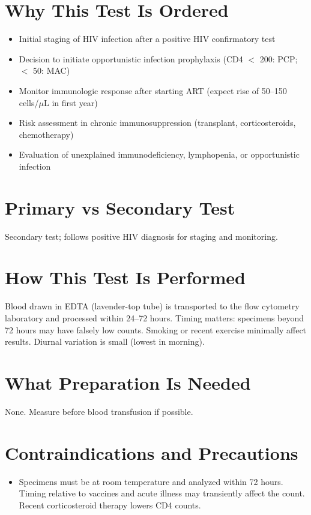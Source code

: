 \section*{Why This Test Is Ordered}
\begin{itemize}
  \item Initial staging of HIV infection after a positive HIV confirmatory test
  \item Decision to initiate opportunistic infection prophylaxis (CD4 $<$ 200: PCP; $<$ 50: MAC)
  \item Monitor immunologic response after starting ART (expect rise of 50--150 cells/$\mu$L in first year)
  \item Risk assessment in chronic immunosuppression (transplant, corticosteroids, chemotherapy)
  \item Evaluation of unexplained immunodeficiency, lymphopenia, or opportunistic infection
\end{itemize}

\section*{Primary vs Secondary Test}
Secondary test; follows positive HIV diagnosis for staging and monitoring.

\section*{How This Test Is Performed}
Blood drawn in EDTA (lavender-top tube) is transported to the flow cytometry laboratory and processed within 24--72 hours. Timing matters: specimens beyond 72 hours may have falsely low counts. Smoking or recent exercise minimally affect results. Diurnal variation is small (lowest in morning).

\section*{What Preparation Is Needed}
None. Measure before blood transfusion if possible.

\section*{Contraindications and Precautions}
\begin{itemize}
  \item Specimens must be at room temperature and analyzed within 72 hours. Timing relative to vaccines and acute illness may transiently affect the count. Recent corticosteroid therapy lowers CD4 counts.
\end{itemize}
